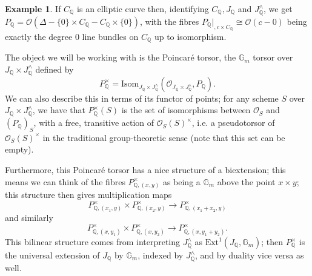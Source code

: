 \documentclass[12pt]{article}
\renewcommand{\G}{\mathbb{G}}
\newcommand{\Q}{\mathbb{Q}}
\renewcommand{\O}{\mathcal{O}}
\theoremstyle{plain}
\theoremstyle{definition}
\newtheorem{exmp}[thm]{Example} %
\theoremstyle{remark}
\begin{document}
\begin{exmp}
If $C_\Q$ is an elliptic curve then, identifying $C_\Q,J_\Q$ and $J_\Q^{\wedge}$, we get $P_\Q = \O(\Delta-\{0\} \times C_\Q - C_\Q \times \{0\})$, with the fibres $P_\Q|_{,c \times C_\Q} \cong \O(c-0)$ being exactly the degree $0$ line bundles on $C_\Q$ up to isomorphism.
\end{exmp}

The object we will be working with is the Poincar\'e torsor, the $\G_m$ torsor over $J_\Q \times J_\Q^\wedge$ defined by \[
P_\Q^\times = \text{Isom}_{J_\Q \times J^\wedge_\Q}(\O_{J_\Q \times J^\wedge_\Q},P_\Q).
\] 
We can also describe this in terms of its functor of points; for any scheme $S$ over $J_\Q \times J^\wedge_\Q$, we have that $P^\times_\Q(S)$ is the set of isomorphisms between $\O_S$ and $(P_\Q)_S$, with a free, transitive action of $\O_S(S)^\times$, i.e. a pseudotorsor of $\O_S(S)^\times$ in the traditional group-theoretic sense (note that this set can be empty).

Furthermore, this Poincar\'e torsor has a nice structure of a biextension; this means we can think of the fibres $P^\times_{\Q,(x,y)}$ as being a $\G_m$ above the point $x \times y$; this structure then gives multiplication maps \[P^\times_{\Q,(x_1,y)} \times P^\times_{\Q,(x_2,y)} \to P^\times_{\Q,(x_1+x_2,y)}\] and similarly \[P^\times_{\Q,(x,y_1)} \times P^\times_{\Q,(x,y_2)} \to P^\times_{\Q,(x,y_1+y_2)}.\]
This bilinear structure comes from interpreting $J_\Q^\wedge$ as $\text{Ext}^1(J_\Q,\G_m)$; then $P_\Q^\times$ is the universal extension of $J_\Q$ by $\G_m$, indexed by $J_\Q^\wedge$, and by duality vice versa as well.
\end{document}
